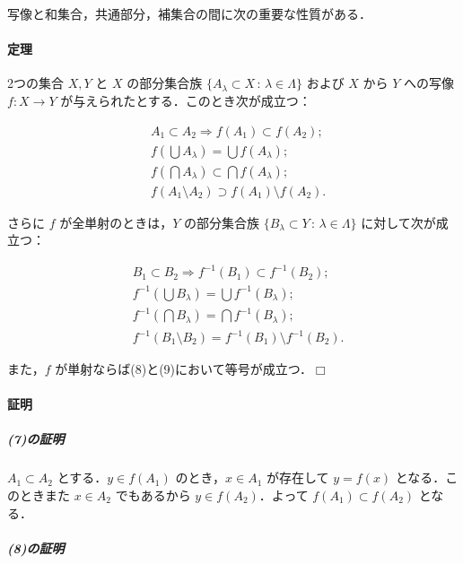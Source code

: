 \documentclass[a5paper,pandoc]{bxjsarticle}
\let\oldparagraph\paragraph
\renewcommand{\paragraph}[1]{\oldparagraph{#1}\mbox{}}
\let\oldsubparagraph\subparagraph
\renewcommand{\subparagraph}[1]{\oldsubparagraph{#1}\mbox{}}
\begin{document}
写像と和集合，共通部分，補集合の間に次の重要な性質がある．

\hypertarget{ux5b9aux7406}{%
\paragraph{定理}\label{ux5b9aux7406}}

2つの集合 \(X, Y\) と \(X\) の部分集合族
\(\{A_\lambda \subset X \,:\,\lambda \in \Lambda \}\) および \(X\) から
\(Y\) への写像 \(f \colon X \to Y\)
が与えられたとする．このとき次が成立つ：

\begin{align}
&A_1 \subset A_2 \Longrightarrow f(A_1) \subset f(A_2);\\
&f(\bigcup A_\lambda) = \bigcup f(A_\lambda);\\
&f(\bigcap A_\lambda) \subset \bigcap f(A_\lambda);\\
&f(A_1 \setminus A_2) \supset f(A_1) \setminus f(A_2).
\end{align}

さらに \(f\) が全単射のときは，\(Y\) の部分集合族
\(\{B_\lambda \subset Y \,:\,\lambda \in \Lambda \}\)
に対して次が成立つ：

\begin{align}
&B_1 \subset B_2 \Longrightarrow f^{-1}(B_1) \subset f^{-1}(B_2);\\
&f^{-1}(\bigcup B_\lambda) = \bigcup f^{-1}(B_\lambda);\\
&f^{-1}(\bigcap B_\lambda) = \bigcap f^{-1}(B_\lambda);\\
&f^{-1}(B_1 \setminus B_2) = f^{-1}(B_1) \setminus f^{-1}(B_2).
\end{align}

また，\(f\) が単射ならば(8)と(9)において等号が成立つ．\(\Box\)

\hypertarget{ux8a3cux660e-1}{%
\paragraph{証明}\label{ux8a3cux660e-1}}

\hypertarget{ux306eux8a3cux660e-3}{%
\subparagraph{(7)の証明}\label{ux306eux8a3cux660e-3}}

\(A_1 \subset A_2\) とする．\(y \in f(A_1)\) のとき，\(x \in A_1\)
が存在して \(y = f(x)\) となる．このときまた \(x \in A_2\) でもあるから
\(y \in f(A_2)\)．よって \(f(A_1) \subset f(A_2)\) となる．

\hypertarget{ux306eux8a3cux660e-4}{%
\subparagraph{(8)の証明}\label{ux306eux8a3cux660e-4}}
\end{document}
